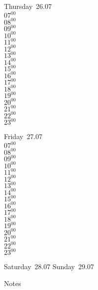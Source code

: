 \documentclass[11pt, a4paper]{book}\usepackage[]{graphicx}\usepackage[]{color}
\begin{document}
\begin{weekdaybox}
  Thursday~26.07\\
  { 
  \vfill
  $07^{00}$\\
$08^{00}$\\
$09^{00}$\\
$10^{00}$\\
$11^{00}$\\
$12^{00}$\\
$13^{00}$\\
$14^{00}$\\
$15^{00}$\\
$16^{00}$\\
$17^{00}$\\
$18^{00}$\\
$19^{00}$\\
$20^{00}$\\
$21^{00}$\\
$22^{00}$\\
$23^{00}$\\
  }
\end{weekdaybox} 
\begin{weekdaybox}
  Friday~27.07\\
  { 
  \vfill
  $07^{00}$\\
$08^{00}$\\
$09^{00}$\\
$10^{00}$\\
$11^{00}$\\
$12^{00}$\\
$13^{00}$\\
$14^{00}$\\
$15^{00}$\\
$16^{00}$\\
$17^{00}$\\
$18^{00}$\\
$19^{00}$\\
$20^{00}$\\
$21^{00}$\\
$22^{00}$\\
$23^{00}$\\
  }
\end{weekdaybox}
\begin{weekendbox}
  Saturday~28.07
  \tcblower
  Sunday~29.07
\end{weekendbox} %
\begin{notebox}
  Notes
\end{notebox}
\clearpage
\end{document}

